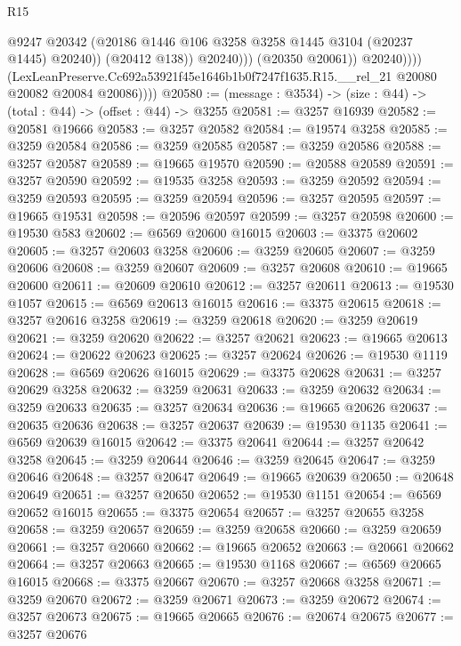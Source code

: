 \begin{lexlean}{R15}
\begin{coremodule}
                              @9247
                              @20342
                              (@20186 @1446 @106 @3258 @3258 @1445 @3104 (@20237 @1445) @20240))
                            (@20412 @138))
                          @20240)))
                    (@20350 @20061))
                  @20240))))
          (LexLeanPreserve.Cc692a53921f45e1646b1b0f7247f1635.R15.__rel_21
            @20080
            @20082
            @20084
            @20086))))
@20580 := (message : @3534) -> (size : @44) -> (total : @44) -> (offset : @44) -> @3255
@20581 := @3257 @16939
@20582 := @20581 @19666
@20583 := @3257 @20582
@20584 := @19574 @3258
@20585 := @3259 @20584
@20586 := @3259 @20585
@20587 := @3259 @20586
@20588 := @3257 @20587
@20589 := @19665 @19570
@20590 := @20588 @20589
@20591 := @3257 @20590
@20592 := @19535 @3258
@20593 := @3259 @20592
@20594 := @3259 @20593
@20595 := @3259 @20594
@20596 := @3257 @20595
@20597 := @19665 @19531
@20598 := @20596 @20597
@20599 := @3257 @20598
@20600 := @19530 @583
@20602 := @6569 @20600 @16015
@20603 := @3375 @20602
@20605 := @3257 @20603 @3258
@20606 := @3259 @20605
@20607 := @3259 @20606
@20608 := @3259 @20607
@20609 := @3257 @20608
@20610 := @19665 @20600
@20611 := @20609 @20610
@20612 := @3257 @20611
@20613 := @19530 @1057
@20615 := @6569 @20613 @16015
@20616 := @3375 @20615
@20618 := @3257 @20616 @3258
@20619 := @3259 @20618
@20620 := @3259 @20619
@20621 := @3259 @20620
@20622 := @3257 @20621
@20623 := @19665 @20613
@20624 := @20622 @20623
@20625 := @3257 @20624
@20626 := @19530 @1119
@20628 := @6569 @20626 @16015
@20629 := @3375 @20628
@20631 := @3257 @20629 @3258
@20632 := @3259 @20631
@20633 := @3259 @20632
@20634 := @3259 @20633
@20635 := @3257 @20634
@20636 := @19665 @20626
@20637 := @20635 @20636
@20638 := @3257 @20637
@20639 := @19530 @1135
@20641 := @6569 @20639 @16015
@20642 := @3375 @20641
@20644 := @3257 @20642 @3258
@20645 := @3259 @20644
@20646 := @3259 @20645
@20647 := @3259 @20646
@20648 := @3257 @20647
@20649 := @19665 @20639
@20650 := @20648 @20649
@20651 := @3257 @20650
@20652 := @19530 @1151
@20654 := @6569 @20652 @16015
@20655 := @3375 @20654
@20657 := @3257 @20655 @3258
@20658 := @3259 @20657
@20659 := @3259 @20658
@20660 := @3259 @20659
@20661 := @3257 @20660
@20662 := @19665 @20652
@20663 := @20661 @20662
@20664 := @3257 @20663
@20665 := @19530 @1168
@20667 := @6569 @20665 @16015
@20668 := @3375 @20667
@20670 := @3257 @20668 @3258
@20671 := @3259 @20670
@20672 := @3259 @20671
@20673 := @3259 @20672
@20674 := @3257 @20673
@20675 := @19665 @20665
@20676 := @20674 @20675
@20677 := @3257 @20676

\end{coremodule}
\end{lexlean}
